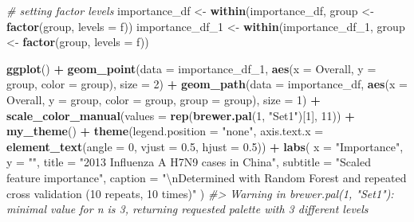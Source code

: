 \documentclass[]{book}
\newenvironment{Shaded}{\begin{snugshade}}{\end{snugshade}}
\newcommand{\CharTok}[1]{\textcolor[rgb]{0.31,0.60,0.02}{#1}}
\newcommand{\CommentTok}[1]{\textcolor[rgb]{0.56,0.35,0.01}{\textit{#1}}}
\newcommand{\DataTypeTok}[1]{\textcolor[rgb]{0.13,0.29,0.53}{#1}}
\newcommand{\DecValTok}[1]{\textcolor[rgb]{0.00,0.00,0.81}{#1}}
\newcommand{\FloatTok}[1]{\textcolor[rgb]{0.00,0.00,0.81}{#1}}
\newcommand{\KeywordTok}[1]{\textcolor[rgb]{0.13,0.29,0.53}{\textbf{#1}}}
\newcommand{\NormalTok}[1]{#1}
\newcommand{\OperatorTok}[1]{\textcolor[rgb]{0.81,0.36,0.00}{\textbf{#1}}}
\newcommand{\StringTok}[1]{\textcolor[rgb]{0.31,0.60,0.02}{#1}}
\begin{document}
\begin{Shaded}
\begin{Highlighting}[]
\CommentTok{# setting factor levels}
\NormalTok{importance_df <-}\StringTok{ }\KeywordTok{within}\NormalTok{(importance_df, group <-}\StringTok{ }\KeywordTok{factor}\NormalTok{(group, }\DataTypeTok{levels =}\NormalTok{ f))}
\NormalTok{importance_df_}\DecValTok{1}\NormalTok{ <-}\StringTok{ }\KeywordTok{within}\NormalTok{(importance_df_}\DecValTok{1}\NormalTok{, group <-}\StringTok{ }\KeywordTok{factor}\NormalTok{(group, }\DataTypeTok{levels =}\NormalTok{ f))}

\KeywordTok{ggplot}\NormalTok{() }\OperatorTok{+}
\StringTok{  }\KeywordTok{geom_point}\NormalTok{(}\DataTypeTok{data =}\NormalTok{ importance_df_}\DecValTok{1}\NormalTok{, }\KeywordTok{aes}\NormalTok{(}\DataTypeTok{x =}\NormalTok{ Overall, }\DataTypeTok{y =}\NormalTok{ group, }
                                         \DataTypeTok{color =}\NormalTok{ group), }\DataTypeTok{size =} \DecValTok{2}\NormalTok{) }\OperatorTok{+}
\StringTok{  }\KeywordTok{geom_path}\NormalTok{(}\DataTypeTok{data =}\NormalTok{ importance_df, }\KeywordTok{aes}\NormalTok{(}\DataTypeTok{x =}\NormalTok{ Overall, }\DataTypeTok{y =}\NormalTok{ group, }\DataTypeTok{color =}\NormalTok{ group, }
                                      \DataTypeTok{group =}\NormalTok{ group), }\DataTypeTok{size =} \DecValTok{1}\NormalTok{) }\OperatorTok{+}
\StringTok{  }\KeywordTok{scale_color_manual}\NormalTok{(}\DataTypeTok{values =} \KeywordTok{rep}\NormalTok{(}\KeywordTok{brewer.pal}\NormalTok{(}\DecValTok{1}\NormalTok{, }\StringTok{"Set1"}\NormalTok{)[}\DecValTok{1}\NormalTok{], }\DecValTok{11}\NormalTok{)) }\OperatorTok{+}
\StringTok{  }\KeywordTok{my_theme}\NormalTok{() }\OperatorTok{+}
\StringTok{  }\KeywordTok{theme}\NormalTok{(}\DataTypeTok{legend.position =} \StringTok{"none"}\NormalTok{,}
        \DataTypeTok{axis.text.x =} \KeywordTok{element_text}\NormalTok{(}\DataTypeTok{angle =} \DecValTok{0}\NormalTok{, }\DataTypeTok{vjust =} \FloatTok{0.5}\NormalTok{, }\DataTypeTok{hjust =} \FloatTok{0.5}\NormalTok{)) }\OperatorTok{+}
\StringTok{  }\KeywordTok{labs}\NormalTok{(}
    \DataTypeTok{x =} \StringTok{"Importance"}\NormalTok{,}
    \DataTypeTok{y =} \StringTok{""}\NormalTok{,}
    \DataTypeTok{title =} \StringTok{"2013 Influenza A H7N9 cases in China"}\NormalTok{,}
    \DataTypeTok{subtitle =} \StringTok{"Scaled feature importance"}\NormalTok{,}
    \DataTypeTok{caption =} \StringTok{"}\CharTok{\textbackslash{}n}\StringTok{Determined with Random Forest and}
\StringTok{    repeated cross validation (10 repeats, 10 times)"}
\NormalTok{  )}
\CommentTok{#> Warning in brewer.pal(1, "Set1"): minimal value for n is 3, returning requested palette with 3 different levels}
\end{Highlighting}
\end{Shaded}
\end{document}
